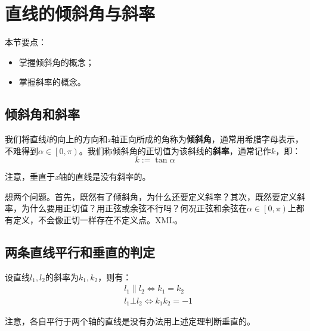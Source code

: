 \section{直线的倾斜角与斜率}

本节要点：
\begin{itemize}
    \item 掌握倾斜角的概念；
    \item 掌握斜率的概念。
\end{itemize}

\subsection{倾斜角和斜率}

\begin{definition}[倾斜角和斜率]
我们将直线$l$的向上的方向和{\it x}轴正向所成的角称为{\bf 倾斜角}，通常用希腊字母表示，不难得到$\alpha \in \left[ 0,\pi \right) $。我们称倾斜角的正切值为该斜线的{\bf 斜率}，通常记作$k$，即：
\[
k:=\tan \alpha
\]
\end{definition}

\begin{tcolorbox}
注意，垂直于{\it x}轴的直线是没有斜率的。
\end{tcolorbox}

\begin{tcolorbox}
想两个问题。首先，既然有了倾斜角，为什么还要定义斜率？其次，既然要定义斜率，为什么要用正切值？用正弦或余弦不行吗？何况正弦和余弦在$\alpha \in \left[ 0,\pi \right) $上都有定义，不会像正切一样存在不定义点。XML。
\end{tcolorbox}

\subsection{两条直线平行和垂直的判定}

\begin{theorem}
设直线$l_1,l_2$的斜率为$k_1,k_2$，则有：
\begin{align*}
&l_1\parallel l_2\Leftrightarrow k_1=k_2 \\
&l_1\bot l_2\Leftrightarrow k_1k_2=-1
\end{align*}
\end{theorem}

\begin{tcolorbox}
注意，各自平行于两个轴的直线是没有办法用上述定理判断垂直的。
\end{tcolorbox}




